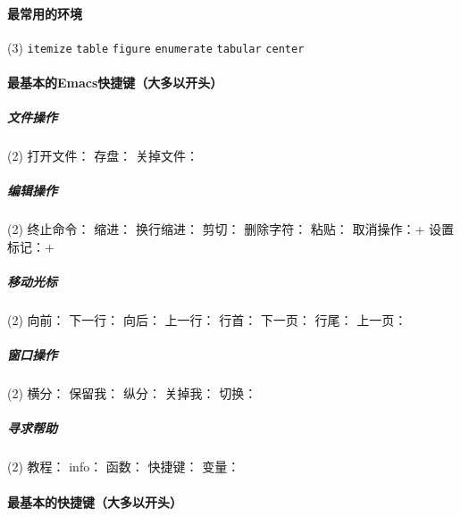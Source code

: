 \paragraph{最常用的环境}

\begin{tasks}(3)
\task[] \texttt{itemize}
\task[] \texttt{table}
\task[] \texttt{figure}
\task[] \texttt{enumerate}
\task[] \texttt{tabular}
\task[] \texttt{center}
\end{tasks}

\paragraph{最基本的Emacs快捷键（大多以开头）}
\label{p:keys}

\subparagraph{文件操作}

\begin{tasks}(2)
\task[] 打开文件：
\task[] 存盘：
\task[] 关掉文件：
\end{tasks}

\subparagraph{编辑操作}

\begin{tasks}(2)
\task[] 终止命令：
\task[] 缩进：
\task[] 换行缩进：
\task[] 剪切：
\task[] 删除字符：
\task[] 粘贴：
\task[] 取消操作：\LKeyCtrl{}+
\task[] 设置标记：\LKeyCtrl{}+\LKeySpace{}
\end{tasks}

\subparagraph{移动光标}

\begin{tasks}(2)
\task[] 向前：
\task[] 下一行：
\task[] 向后：
\task[] 上一行：
\task[] 行首：
\task[] 下一页：
\task[] 行尾：
\task[] 上一页：
\end{tasks}

\subparagraph{窗口操作}
\begin{tasks}(2)
\task[] 横分：
\task[] 保留我：
\task[] 纵分：
\task[] 关掉我：
\task[] 切换：
\end{tasks}

\subparagraph{寻求帮助}

\begin{tasks}(2)
\task[] 教程：
\task[] info：
\task[] 函数：
\task[] 快捷键：
\task[] 变量：
\end{tasks}

\paragraph{最基本的\auctex{}快捷键（大多以开头）}

